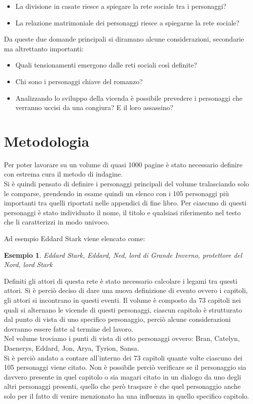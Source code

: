 \documentclass[a4paper]{article}
\begin{document}
\begin{itemize}
\item La divisione in casate riesce a spiegare la rete sociale tra i personaggi?
\item La relazione matrimoniale dei personaggi riesce a spiegarne la rete sociale?
\end{itemize}
Da queste due domande principali si diramano alcune considerazioni, secondarie ma altrettanto importanti:

\begin{itemize}
\item Quali tensionamenti emergono dalle reti sociali così definite?
\item Chi sono i personaggi chiave del romanzo?
\item Analizzando lo sviluppo della vicenda è possibile prevedere i personaggi che verranno uccisi da una congiura? E il loro assassino?
\end{itemize}

\section{Metodologia}

Per poter lavorare su un volume di quasi 1000 pagine è stato necessario definire con estrema cura il metodo di indagine.\\
Si è quindi pensato di definire i personaggi principali del volume tralasciando solo le comparse, prendendo in esame quindi un elenco con i 105 personaggi più importanti tra quelli riportati nelle appendici di fine libro. Per ciascuno di questi personaggi è stato individuato il nome, il titolo e qualsiasi riferimento nel testo che li caratterizzi in modo univoco.\\
\newtheorem{xxx}{Esempio}
Ad esempio Eddard Stark viene elencato come:
\begin{xxx}
Eddard Stark, Eddard, Ned, lord di Grande Inverno, protettore del Nord, lord Stark
\end{xxx}

Definiti gli attori di questa rete è stato necessario calcolare i legami tra questi attori. Si è perciò deciso di dare una nuova definizione di evento ovvero i capitoli, gli attori si incontrano in questi eventi. Il volume è composto da 73 capitoli nei quali si alternano le vicende di questi personaggi, ciascun capitolo è strutturato dal punto di vista di uno specifico personaggio, perciò alcune considerazioni dovranno essere fatte al termine del lavoro.\\
Nel volume troviamo i punti di vista di otto personaggi ovvero: Bran, Catelyn, Daenerys, Eddard, Jon, Arya, Tyrion, Sansa.\\
Si è perciò andato a contare all'interno dei 73 capitoli quante volte ciascuno dei 105 personaggi viene citato. Non è possibile perciò verificare se il personaggio sia davvero presente in quel capitolo o sia magari citato in un dialogo da uno degli altri personaggi presenti, quello che però traspare è che quel personaggio anche solo per il fatto di venire menzionato ha una influenza in quello specifico capitolo.\\
\end{document}
